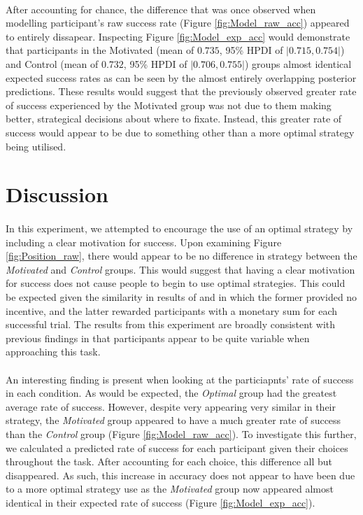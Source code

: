 \documentclass[12pt]{article}
\begin{document}
\paragraph{} After accounting for chance, the difference that was once observed when modelling participant's raw success rate (Figure \ref{fig:Model_raw_acc}) appeared to entirely dissapear. Inspecting Figure \ref{fig:Model_exp_acc} would demonstrate that participants in the Motivated (mean of $0.735$, 95\% HPDI of $|0.715, 0.754|$) and Control (mean of $0.732$, 95\% HPDI of $|0.706, 0.755|$) groups almost identical expected success rates as can be seen by the almost entirely overlapping posterior predictions. These results would suggest that the previously observed greater rate of success experienced by the Motivated group was not due to them making better, strategical decisions about where to fixate. Instead, this greater rate of success would appear to be due to something other than a more optimal strategy being utilised. 


\section*{Discussion}

\paragraph{} In this experiment, we attempted to encourage the use of an optimal strategy by including a clear motivation for success. Upon examining Figure \ref{fig:Position_raw}, there would appear to be no difference in strategy between the \textit{Motivated} and \textit{Control} groups. This would suggest that having a clear motivation for success does not cause people to begin to use optimal strategies. This could be expected given the similarity in results of \cite{clarke2015failure} and \cite{morvan2012human} in which the former provided no incentive, and the latter rewarded participants with a monetary sum for each successful trial. The results from this experiment are broadly consistent with previous findings in that participants appear to be quite variable when approaching this task.
 
\paragraph{} An interesting finding is present when looking at the particiapnts' rate of success in each condition. As would be expected, the \textit{Optimal} group had the greatest average rate of success. However, despite very appearing very similar in their strategy, the \textit{Motivated} group appeared to have a much greater rate of success than the \textit{Control} group (Figure \ref{fig:Model_raw_acc}). To investigate this further, we calculated a predicted rate of success for each participant given their choices throughout the task. After accounting for each choice, this difference all but disappeared. As such, this increase in accuracy does not appear to have been due to a more optimal strategy use as the \textit{Motivated} group now appeared almost identical in their expected rate of success (Figure \ref{fig:Model_exp_acc}).
\end{document}
